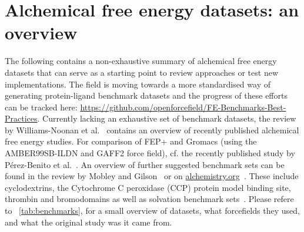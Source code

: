 \documentclass[9pt,bestpractices]{livecoms}
\begin{document}
\section{Alchemical free energy datasets: an overview}
\label{sec:benchmark}
The following contains a non-exhaustive summary of alchemical free energy datasets that can serve as a starting point to review approaches or test new implementations. The field is moving towards a more standardised way of generating protein-ligand benchmark datasets and the progress of these efforts can be tracked here: \url{https://github.com/openforcefield/FE-Benchmarks-Best-Practices}. Currently lacking an exhaustive set of benchmark datasets, the review by Williams-Noonan et al.~\cite{williams-noonan2018free} contains an overview of recently published alchemical free energy studies. For comparison of FEP+ and Gromacs (using the AMBER99SB-ILDN and GAFF2 force field), cf. the recently published study by Pérez-Benito et al.~\cite{perez-benito2019predicting}.
An overview of further suggested benchmark sets can be found in the review by Mobley and Gilson~\cite{mobley2017predicting} or on \url{alchemistry.org}~\cite{alchemistry}. These include cyclodextrins, the Cytochrome C peroxidase (CCP) protein model binding site, thrombin and bromodomains as well as solvation benchmark sets~\cite{paliwal2011benchmark}. Please refere to ~\ref{tab:benchmarks}, for a small overview of datasets, what forcefields they used, and what the original study was it came from. 
\end{document}
